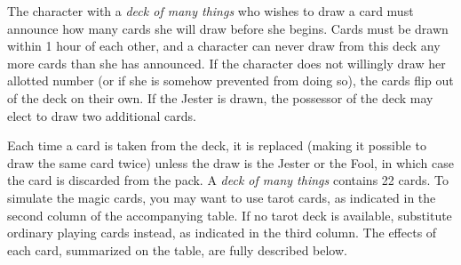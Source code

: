 The character with a \textit{deck of many things }who wishes to draw a card must announce how many cards she will draw before she begins. Cards must be drawn within 1 hour of each other, and a character can never draw from this deck any more cards than she has announced. If the character does not willingly draw her allotted number (or if she is somehow prevented from doing so), the cards flip out of the deck on their own. If the Jester is drawn, the possessor of the deck may elect to draw two additional cards.
				
Each time a card is taken from the deck, it is replaced (making it possible to draw the same card twice) unless the draw is the Jester or the Fool, in which case the card is discarded from the pack. A \textit{deck of many things }contains 22 cards. To simulate the magic cards, you may want to use tarot cards, as indicated in the second column of the accompanying table. If no tarot deck is available, substitute ordinary playing cards instead, as indicated in the third column. The effects of each card, summarized on the table, are fully described below.
				
